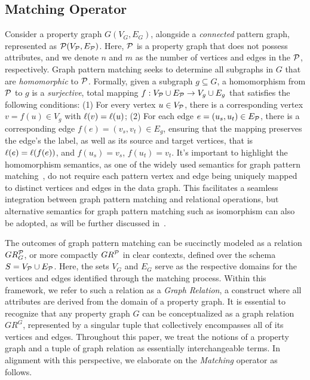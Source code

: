 


\subsection{Matching Operator}
\label{sec:matching-operator}
Consider a property graph \(G(V_G, E_G)\), alongside a \emph{connected} pattern graph, represented as \(\mathcal{P}(V_{\mathcal{P}}, E_{\mathcal{P}})\). Here, \(\mathcal{P}\) is a property graph that does not possess attributes, and
we denote $n$ and $m$ as the number of vertices and edges in the $\mathcal{P}$, respectively.
Graph pattern matching seeks to determine all subgraphs in \(G\) that are \emph{homomorphic} to \(\mathcal{P}\).
Formally, given a subgraph $g \subseteq G$, a homomorphism from \(\mathcal{P}\) to \(g\) is a \emph{surjective}, total mapping \(f: V_{\mathcal{P}} \cup E_{\mathcal{P}} \to V_{g} \cup E_{g}\) that satisfies the following conditions: (1) For every vertex \(u \in V_{\mathcal{P}}\), there is a corresponding vertex \(v = f(u) \in V_{g}\) with \(\mathcal{\ell}(v) = \mathcal{\ell}(u)\); (2) For each edge \(e = (u_s, u_t) \in E_{\mathcal{P}}\), there is a corresponding edge \(f(e) = (v_s, v_t) \in E_{g}\), ensuring that the mapping preserves the edge's the label, as well as its source and target vertices, that is \(\mathcal{\ell}(e) = \mathcal{\ell}(f(e))\), and \(f(u_s) = v_s\), \(f(u_t) = v_t\). It's important to highlight the homomorphism semantics, as one of the widely used semantics for graph pattern matching~\cite{angles2017foundations}, do not require each pattern vertex and edge being uniquely mapped to distinct vertices and edges in the data graph. This facilitates a seamless integration between graph pattern matching and relational operations, but alternative semantics for graph pattern matching such as isomorphism can also be adopted, as will be further discussed in~.

The outcomes of graph pattern matching can be succinctly modeled as a relation \(GR_G^{\mathcal{P}}\), or more compactly \(GR^{\mathcal{P}}\) in clear contexts, defined over the schema \(S = V_{\mathcal{P}} \cup E_{\mathcal{P}}\). Here, the sets \(V_G\) and \(E_G\) serve as the respective domains for the vertices and edges identified through the matching process. Within this framework, we refer to such a relation as a \emph{Graph Relation}, a construct where all attributes are derived from the domain of a property graph.
It is essential to recognize that any property graph \(G\) can be conceptualized as a graph relation \(GR^G\), represented by a singular tuple that collectively encompasses all of its vertices and edges. Throughout this paper, we treat the notions of a property graph and a tuple of graph relation as essentially interchangeable terms. In alignment with this perspective, we elaborate on the \emph{Matching} operator as follows.

